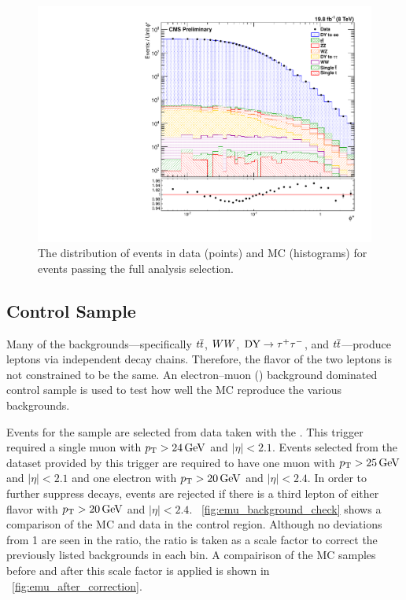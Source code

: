\begin{figure}[!htbp]
    \centering
    \includegraphics[width=\textwidth]{figures/phistar.pdf}
    \caption[
        The \phistar distribution of events in data and MC.
    ]{
        The \phistar distribution of events in data (points) and MC
        (histograms) for events passing the full analysis selection.
    }
    \label{fig:phistar_background}
\end{figure}

\subsection{\emu Control Sample}

Many of the backgrounds---specifically $t\overline{t}$, $WW$, $\text{DY} \to \tau^{+} \tau^{-}$, and
$t\overline{t}$---produce leptons via independent decay chains. Therefore, the flavor
of the two leptons is not constrained to be the same. An electron--muon
(\emu) background dominated control sample is used to test how well the MC
reproduce the various backgrounds.

Events for the \emu sample are selected from data taken with the
\SingleMuonTrigger. This trigger required a single muon with $p_{\mathrm{T}} > 24 \,\text{Ge\hspace{-.08em}V}$
and $|\eta| < 2.1$. Events selected from the dataset provided by this trigger
are required to have one muon with $p_{\mathrm{T}} > 25 \,\text{Ge\hspace{-.08em}V}$ and $|\eta| < 2.1$ and one
electron with $p_{\mathrm{T}} > 20 \,\text{Ge\hspace{-.08em}V}$ and $|\eta| < 2.4$. In order to further suppress
\Z decays, events are rejected if there is a third lepton of either flavor with
$p_{\mathrm{T}} > 20 \,\text{Ge\hspace{-.08em}V}$ and $|\eta| < 2.4$. \FIG~\ref{fig:emu_background_check} shows a
comparison of the MC and data in the control region. Although no deviations
from \num{1} are seen in the ratio, the ratio is taken as a scale factor to
correct the previously listed backgrounds in each bin. A compairison of the
\Ztomumu MC samples before and after this scale factor is applied is shown in
\FIG~\ref{fig:emu_after_correction}.

